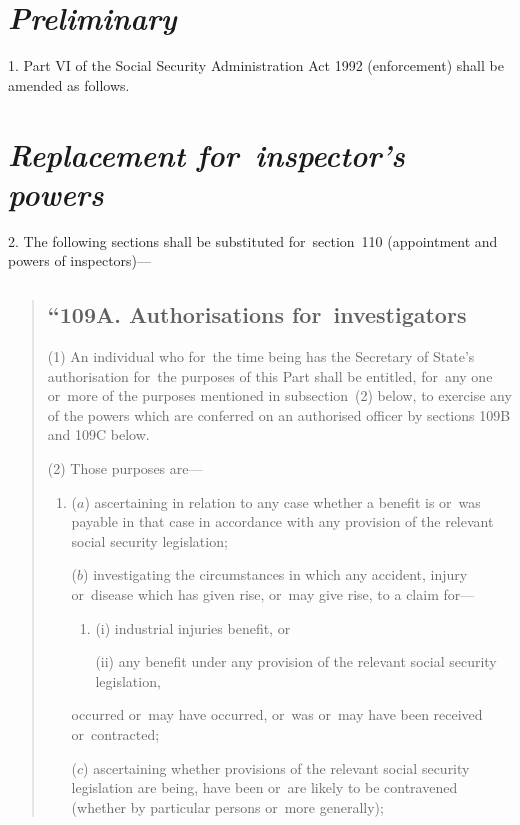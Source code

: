\documentclass[12pt,a4paper]{article}
\begin{document}
\renewcommand\parthead{--- Schedule 6}

\section*{\itshape Preliminary}

1. Part VI of the Social Security Administration Act 1992 (enforcement) shall be amended as follows.

\section*{\itshape Replacement for~inspector’s powers}

2. The following sections shall be substituted for~section~110 (appointment and powers of inspectors)—
\begin{quotation}
\subsection*{“109A. Authorisations for~investigators}

(1) An individual who for~the time being has the Secretary of State’s authorisation for~the purposes of this Part shall be entitled, for~any one or~more of the purposes mentioned in subsection~(2)  below, to exercise any of the powers which are conferred on an authorised officer by sections 109B and 109C below.

(2) Those purposes are—
\begin{enumerate}\item[]
($a$) ascertaining in relation to any case whether a benefit is or~was payable in that case in accordance with any provision of the relevant social security legislation;

($b$) investigating the circumstances in which any accident, injury or~disease which has given rise, or~may give rise, to a claim for—
\begin{enumerate}\item[]
(i) industrial injuries benefit, or

(ii) any benefit under any provision of the relevant social security legislation,
\end{enumerate}
occurred or~may have occurred, or~was or~may have been received or~contracted;

($c$) ascertaining whether provisions of the relevant social security legislation are being, have been or~are likely to be contravened (whether by particular persons or~more generally);


\end{enumerate}
\end{quotation}
\end{document}
